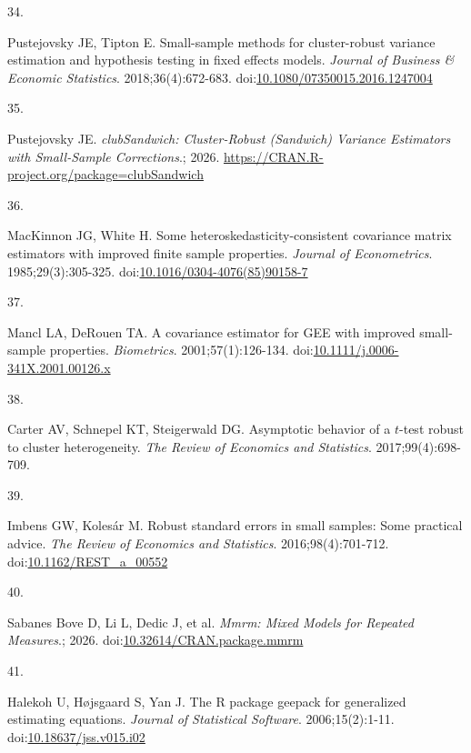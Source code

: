 \documentclass[
  11pt,
]{article}
\newlength{\cslhangindent}
\newlength{\csllabelwidth}
\newenvironment{CSLReferences}[2] %
 {\begin{list}{}{%
  \setlength{\itemindent}{0pt}
  \setlength{\leftmargin}{0pt}
  \setlength{\parsep}{0pt}
  \ifodd #1
   \setlength{\leftmargin}{\cslhangindent}
   \setlength{\itemindent}{-1\cslhangindent}
  \fi
  \setlength{\itemsep}{#2\baselineskip}}}
 {\end{list}}
\newcommand{\CSLLeftMargin}[1]{\parbox[t]{\csllabelwidth}{\strut#1\strut}}
\newcommand{\CSLRightInline}[1]{\parbox[t]{\linewidth - \csllabelwidth}{\strut#1\strut}}
\begin{document}
\begin{CSLReferences}{0}{1}
\CSLLeftMargin{34. }%
\CSLRightInline{Pustejovsky JE, Tipton E. Small-sample methods for cluster-robust variance estimation and hypothesis testing in fixed effects models. \emph{Journal of Business \& Economic Statistics}. 2018;36(4):672-683. doi:\href{https://doi.org/10.1080/07350015.2016.1247004}{10.1080/07350015.2016.1247004}}

\CSLLeftMargin{35. }%
\CSLRightInline{Pustejovsky JE. \emph{clubSandwich: Cluster-Robust (Sandwich) Variance Estimators with Small-Sample Corrections}.; 2026. \url{https://CRAN.R-project.org/package=clubSandwich}}

\CSLLeftMargin{36. }%
\CSLRightInline{MacKinnon JG, White H. Some heteroskedasticity-consistent covariance matrix estimators with improved finite sample properties. \emph{Journal of Econometrics}. 1985;29(3):305-325. doi:\href{https://doi.org/10.1016/0304-4076(85)90158-7}{10.1016/0304-4076(85)90158-7}}

\CSLLeftMargin{37. }%
\CSLRightInline{Mancl LA, DeRouen TA. A covariance estimator for {GEE} with improved small-sample properties. \emph{Biometrics}. 2001;57(1):126-134. doi:\href{https://doi.org/10.1111/j.0006-341X.2001.00126.x}{10.1111/j.0006-341X.2001.00126.x}}

\CSLLeftMargin{38. }%
\CSLRightInline{Carter AV, Schnepel KT, Steigerwald DG. Asymptotic behavior of a \(t\)-test robust to cluster heterogeneity. \emph{The Review of Economics and Statistics}. 2017;99(4):698-709.}

\CSLLeftMargin{39. }%
\CSLRightInline{Imbens GW, Kolesár M. Robust standard errors in small samples: Some practical advice. \emph{The Review of Economics and Statistics}. 2016;98(4):701-712. doi:\href{https://doi.org/10.1162/REST_a_00552}{10.1162/REST\_a\_00552}}

\CSLLeftMargin{40. }%
\CSLRightInline{Sabanes Bove D, Li L, Dedic J, et al. \emph{Mmrm: Mixed Models for Repeated Measures}.; 2026. doi:\href{https://doi.org/10.32614/CRAN.package.mmrm}{10.32614/CRAN.package.mmrm}}

\CSLLeftMargin{41. }%
\CSLRightInline{Halekoh U, Højsgaard S, Yan J. The {R} package geepack for generalized estimating equations. \emph{Journal of Statistical Software}. 2006;15(2):1-11. doi:\href{https://doi.org/10.18637/jss.v015.i02}{10.18637/jss.v015.i02}}


\end{CSLReferences}
\end{document}
